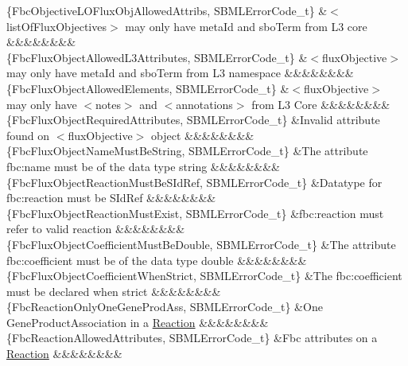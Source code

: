 \begin{DoxyParagraph}{}
\begin{longtabu}
\{Fbc\+Objective\+L\+O\+Flux\+Obj\+Allowed\+Attribs, S\+B\+M\+L\+Error\+Code\+\_\+t\} &{\ttfamily $<$list\+Of\+Flux\+Objectives$>$} may only have \textquotesingle{}meta\+Id\textquotesingle{} and \textquotesingle{}sbo\+Term\textquotesingle{} from L3 core &&&&&&&&\\
\{Fbc\+Flux\+Object\+Allowed\+L3\+Attributes, S\+B\+M\+L\+Error\+Code\+\_\+t\} &{\ttfamily $<$flux\+Objective$>$} may only have \textquotesingle{}meta\+Id\textquotesingle{} and \textquotesingle{}sbo\+Term\textquotesingle{} from L3 namespace &&&&&&&&\\
\{Fbc\+Flux\+Object\+Allowed\+Elements, S\+B\+M\+L\+Error\+Code\+\_\+t\} &{\ttfamily $<$flux\+Objective$>$} may only have {\ttfamily $<$notes$>$} and {\ttfamily $<$annotations$>$} from L3 Core &&&&&&&&\\
\{Fbc\+Flux\+Object\+Required\+Attributes, S\+B\+M\+L\+Error\+Code\+\_\+t\} &Invalid attribute found on {\ttfamily $<$flux\+Objective$>$} object &&&&&&&&\\
\{Fbc\+Flux\+Object\+Name\+Must\+Be\+String, S\+B\+M\+L\+Error\+Code\+\_\+t\} &The attribute \textquotesingle{}fbc\+:name\textquotesingle{} must be of the data type string &&&&&&&&\\
\{Fbc\+Flux\+Object\+Reaction\+Must\+Be\+S\+Id\+Ref, S\+B\+M\+L\+Error\+Code\+\_\+t\} &Datatype for \textquotesingle{}fbc\+:reaction\textquotesingle{} must be S\+Id\+Ref &&&&&&&&\\
\{Fbc\+Flux\+Object\+Reaction\+Must\+Exist, S\+B\+M\+L\+Error\+Code\+\_\+t\} &\textquotesingle{}fbc\+:reaction\textquotesingle{} must refer to valid reaction &&&&&&&&\\
\{Fbc\+Flux\+Object\+Coefficient\+Must\+Be\+Double, S\+B\+M\+L\+Error\+Code\+\_\+t\} &The attribute \textquotesingle{}fbc\+:coefficient\textquotesingle{} must be of the data type double &&&&&&&&\\
\{Fbc\+Flux\+Object\+Coefficient\+When\+Strict, S\+B\+M\+L\+Error\+Code\+\_\+t\} &The \textquotesingle{}fbc\+:coefficient\textquotesingle{} must be declared when strict &&&&&&&&\\
\{Fbc\+Reaction\+Only\+One\+Gene\+Prod\+Ass, S\+B\+M\+L\+Error\+Code\+\_\+t\} &One Gene\+Product\+Association in a \hyperlink{class_reaction}{Reaction} &&&&&&&&\\
\{Fbc\+Reaction\+Allowed\+Attributes, S\+B\+M\+L\+Error\+Code\+\_\+t\} &Fbc attributes on a \hyperlink{class_reaction}{Reaction} &&&&&&&&\\

\end{longtabu}
\end{DoxyParagraph}
